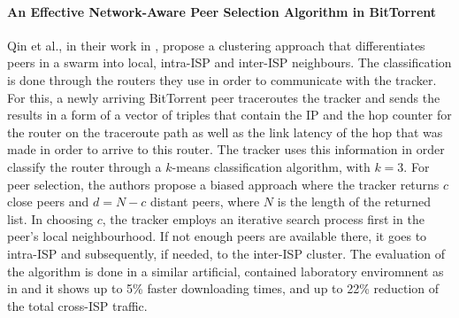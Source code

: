 \paragraph*{ \bf An Effective Network-Aware Peer Selection Algorithm in
BitTorrent}
Qin et al., in their work in \cite{qlzg_biteffpeersel_2009}, propose a
clustering approach that differentiates peers in a swarm into local, intra-ISP
and inter-ISP neighbours. The classification is done through the routers they
use in order to communicate with the tracker. For this, a newly arriving
BitTorrent peer traceroutes the tracker and sends the results in a form of a
vector of triples that contain the IP and the hop counter for the router on the
traceroute path as well as the link latency of the hop that was made in order to
arrive to this router. The tracker uses this information in order classify the
router through a $k$-means classification algorithm, with $k = 3$. For peer
selection, the authors propose a biased approach where the tracker returns $c$
close peers and $d = N - c$ distant peers, where $N$ is the length of the
returned list. In choosing $c$, the tracker employs an iterative search process
first in the peer's local neighbourhood. If not enough peers are available
there, it goes to intra-ISP and subsequently, if needed, to the inter-ISP
cluster. The evaluation of the algorithm is done in a similar artificial,
contained laboratory enviromnent as in \cite{lcy_utaps_2008} and it shows up to
5\% faster downloading times, and up to 22\% reduction of the total cross-ISP
traffic.


